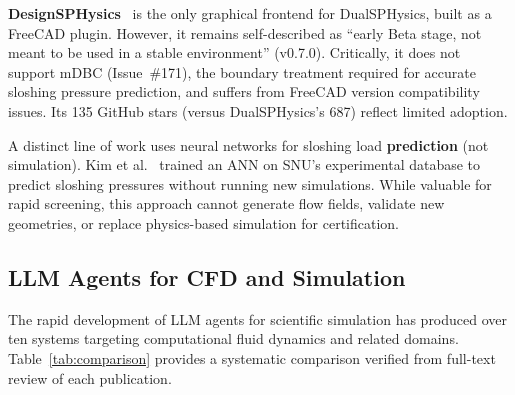 \documentclass[11pt]{article}
\begin{document}
\textbf{DesignSPHysics}~\citep{vieira2017designsphysics} is the only graphical frontend for DualSPHysics, built as a FreeCAD plugin. However, it remains self-described as ``early Beta stage, not meant to be used in a stable environment'' (v0.7.0). Critically, it does not support mDBC (Issue~\#171), the boundary treatment required for accurate sloshing pressure prediction, and suffers from FreeCAD version compatibility issues. Its 135 GitHub stars (versus DualSPHysics's 687) reflect limited adoption.

A distinct line of work uses neural networks for sloshing load \textbf{prediction} (not simulation). Kim et al.~\citep{kim2019sloshing} trained an ANN on SNU's experimental database to predict sloshing pressures without running new simulations. While valuable for rapid screening, this approach cannot generate flow fields, validate new geometries, or replace physics-based simulation for certification.

\subsection{LLM Agents for CFD and Simulation}

The rapid development of LLM agents for scientific simulation has produced over ten systems targeting computational fluid dynamics and related domains. Table~\ref{tab:comparison} provides a systematic comparison verified from full-text review of each publication.
\end{document}

